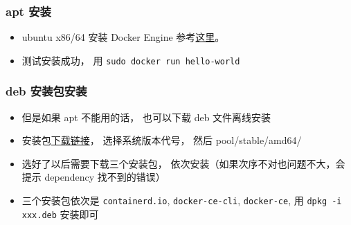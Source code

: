 
\begin{issues}
\issueDraft
\end{issues}

\subsubsection{apt 安装}
\begin{itemize}
\item ubuntu x86/64 安装 Docker Engine 参考\href{https://docs.docker.com/install/linux/docker-ce/ubuntu/}{这里}。
\item 测试安装成功， 用 \verb`sudo docker run hello-world`
\end{itemize}

\subsubsection{deb 安装包安装}
\begin{itemize}
\item 但是如果 apt 不能用的话， 也可以下载 deb 文件离线安装
\item 安装包\href{https://download.docker.com/linux/ubuntu/dists/}{下载链接}， 选择系统版本代号， 然后 pool/stable/amd64/
\item 选好了以后需要下载三个安装包， 依次安装（如果次序不对也问题不大，会提示 dependency 找不到的错误）
\item 三个安装包依次是 \verb`containerd.io`, \verb`docker-ce-cli`, \verb`docker-ce`, 用 \verb`dpkg -i xxx.deb` 安装即可
\end{itemize}

